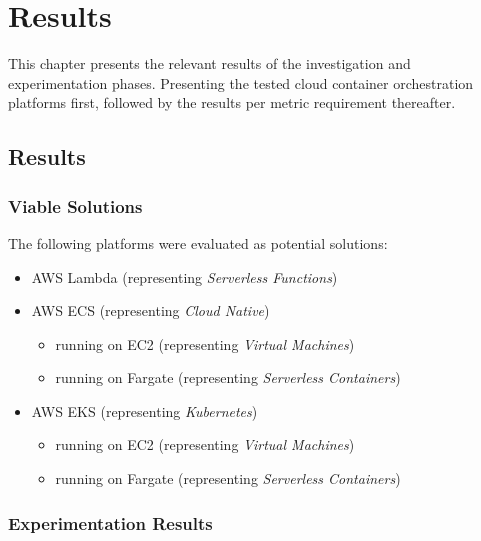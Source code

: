 \part{Results}

This chapter presents the relevant results of the investigation and experimentation phases.
Presenting the tested cloud container orchestration platforms first,
followed by the results per metric requirement thereafter.

\chapter{Results}

\section{Viable Solutions}
The following platforms were evaluated as potential solutions:
\begin{itemize}
  \item AWS Lambda (representing \textit{Serverless Functions})
  \item AWS ECS (representing \textit{Cloud Native})
        \begin{itemize}
          \item running on EC2 (representing \textit{Virtual Machines})
          \item running on Fargate (representing \textit{Serverless Containers})
        \end{itemize}
  \item AWS EKS (representing \textit{Kubernetes})
        \begin{itemize}
          \item running on EC2 (representing \textit{Virtual Machines})
          \item running on Fargate (representing \textit{Serverless Containers})
        \end{itemize}
\end{itemize}

\section{Experimentation Results}

